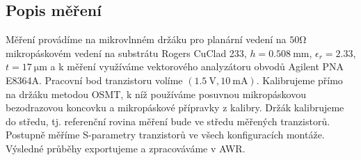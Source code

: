 \documentclass[11pt,a4paper]{article}
\newcommand{\Ohm}{\mathrm{\Omega}}
\newcommand{\mm}{\mathrm{mm}}
\newcommand{\mum}{\mathrm{\mu m}}
\begin{document}
\subsection*{Popis měření}
Měření provádíme na mikrovlnném držáku pro planární vedení na $50\Ohm$ mikropáskovém vedení na substrátu Rogers CuClad 233, $h = 0.508\ \mm$, $\epsilon_r = 2.33$, $t = 17\ \mum$ a k měření využíváme vektorového analyzátoru obvodů Agilent PNA E8364A. Pracovní bod tranzistoru volíme $(1.5\ \mathrm{V},10\ \mathrm{mA})$. Kalibrujeme přímo na držáku metodou OSMT, k níž používáme posuvnou mikropáskovou bezodrazovou koncovku a mikropáskové přípravky z kalibry. Držák kalibrujeme do středu, tj. referenční rovina měření bude ve středu měřených tranzistorů. Postupně měříme S-parametry tranzistorů ve všech konfiguracích montáže. Výsledné průběhy exportujeme a zpracováváme v AWR.
\end{document}
